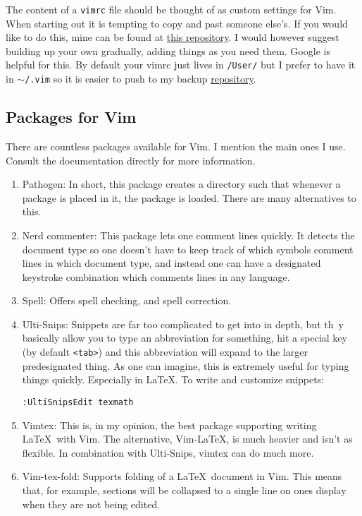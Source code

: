 \documentclass{amsart}
\begin{document}
The content of a \texttt{vimrc} file should be thought of as custom settings for Vim.
When starting out it is tempting to copy and past someone else's. If you would like to do
this, mine can be found at \href{https://github.com/jacksontvd/vim}{this repository}. I
would however suggest building up your own gradually, adding things as you need them.
Google is helpful for this. 
By default your vimrc just lives in \texttt{/User/} but I prefer to have it in 
$\sim$\texttt{/.vim} so it is easier to push to my backup
\href{https://github.com/jacksontvd/vim}{repository}.

\subsection{Packages for Vim}

There are countless packages available for Vim. I mention the main ones I use. Consult the
documentation directly for more information.
\begin{enumerate}
\item Pathogen: In short, this package creates a directory such that whenever a package is
placed in it, the package is loaded. There are many alternatives to this. 
\item Nerd commenter: This package lets one comment lines quickly. It detects the document
type so one doesn't have to keep track of which symbols comment lines in which document
type, and instead one can have a designated keystroke combination which comments lines in
any language. 
\item Spell: Offers spell checking, and spell correction.
\item Ulti-Snips: Snippets are far too complicated to get into in depth, but th\ y
basically allow you to type an abbreviation for something, hit a special key (by default
\texttt{<tab>}) and this abbreviation will expand to the larger predesignated thing. As
one can imagine, this is extremely useful for typing things quickly. Especially in \LaTeX.
To write and customize snippets:
\begin{verbatim}
:UltiSnipsEdit texmath
\end{verbatim}
\item Vimtex: This is, in my opinion, the best package supporting writing \LaTeX\ with Vim.
The alternative, Vim-LaTeX, is much heavier and isn't as flexible. In combination with
Ulti-Snips, vimtex can do much more. 
\item Vim-tex-fold: Supports folding of a \LaTeX\ document in Vim. This means that, for
example, sections will be collapsed to a single line on ones display when they are not
being edited. 
\end{enumerate}
\end{document}
